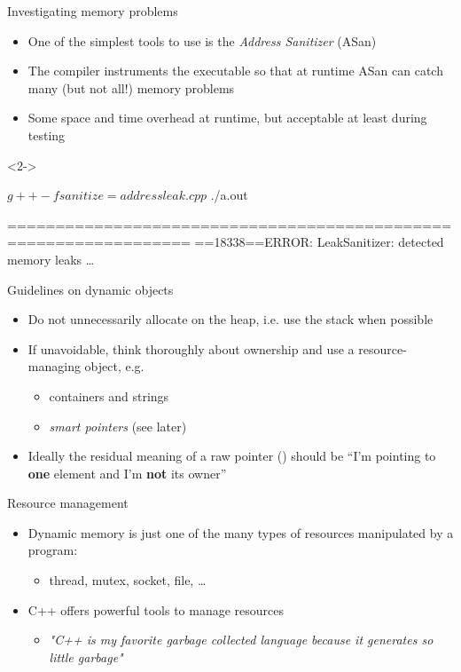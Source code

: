 \begin{frame}[fragile]{Investigating memory problems}

  \begin{itemize}
  \item One of the simplest tools to use is the \textit{Address Sanitizer}
    (ASan)
  \item The compiler instruments the executable so that at runtime ASan can
    catch many (but not all!) memory problems
  \item Some space and time overhead at runtime, but acceptable at least during
    testing
  \end{itemize}

    \begin{shellblock}<2->{
$ g++ -fsanitize=address leak.cpp
$ ./a.out

=================================================================
==18338==ERROR: LeakSanitizer: detected memory leaks
\ldots}\end{shellblock}

\end{frame}

\begin{frame}{Guidelines on dynamic objects}

  \begin{itemize}
  \item Do not unnecessarily allocate on the heap, i.e. use the stack when
    possible
  \item If unavoidable, think thoroughly about ownership and use a
    resource-managing object, e.g.
    \begin{itemize}
    \item containers and strings
    \item \textit{smart pointers} (see later)
    \end{itemize}
  \item Ideally the residual meaning of a raw pointer () should be
    ``I'm pointing to \textbf{one} element and I'm \textbf{not} its owner''
  \end{itemize}
\end{frame}

\begin{frame}{Resource management}
  \begin{itemize}
  \item<1-> Dynamic memory is just one of the many types of resources manipulated by a
    program:
    \begin{itemize}
    \item thread, mutex, socket, file, \ldots
    \end{itemize}
  \item<2-> C++ offers powerful tools to manage resources
    \begin{itemize}
    \item \textit{"C++ is my favorite garbage collected language because it
      generates so little garbage"}
    \end{itemize}
  \end{itemize}

\end{frame}

